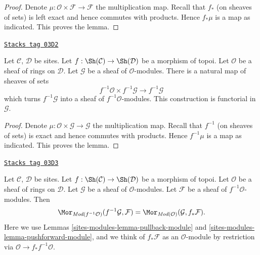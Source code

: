 \begin{proof}
Denote $\mu : \mathcal{O} \times \mathcal{F} \to \mathcal{F}$ the
multiplication map. Recall that $f_*$ (on sheaves of sets) is left exact
and hence commutes with products. Hence $f_*\mu$ is a map as
indicated. This proves the lemma.
\end{proof}

\begin{lemma}
\label{sites-modules-lemma-pullback-module}
\href{https://stacks.math.columbia.edu/tag/03D2}{\texttt{Stacks tag 03D2}}

Let $\mathcal{C}$, $\mathcal{D}$ be sites.
Let $f : \Sh(\mathcal{C}) \to \Sh(\mathcal{D})$
be a morphism of topoi.
Let $\mathcal{O}$ be a sheaf of rings on $\mathcal{D}$.
Let $\mathcal{G}$ be a sheaf of $\mathcal{O}$-modules.
There is a natural map of sheaves of sets
$$
f^{-1}\mathcal{O} \times f^{-1}\mathcal{G}
\longrightarrow
f^{-1}\mathcal{G}
$$
which turns $f^{-1}\mathcal{G}$ into a sheaf of $f^{-1}\mathcal{O}$-modules.
This construction is functorial in $\mathcal{G}$.
\end{lemma}

\begin{proof}
Denote $\mu : \mathcal{O} \times \mathcal{G} \to \mathcal{G}$ the
multiplication map. Recall that $f^{-1}$ (on sheaves of sets) is exact
and hence commutes with products. Hence $f^{-1}\mu$ is a map as
indicated. This proves the lemma.
\end{proof}

\begin{lemma}
\label{sites-modules-lemma-adjoint-push-pull-modules}
\href{https://stacks.math.columbia.edu/tag/03D3}{\texttt{Stacks tag 03D3}}

Let $\mathcal{C}$, $\mathcal{D}$ be sites.
Let $f : \Sh(\mathcal{C}) \to \Sh(\mathcal{D})$
be a morphism of topoi.
Let $\mathcal{O}$ be a sheaf of rings on $\mathcal{D}$.
Let $\mathcal{G}$ be a sheaf of $\mathcal{O}$-modules.
Let $\mathcal{F}$ be a sheaf of $f^{-1}\mathcal{O}$-modules.
Then
$$
\Mor_{\textit{Mod}(f^{-1}\mathcal{O})}(f^{-1}\mathcal{G}, \mathcal{F})
=
\Mor_{\textit{Mod}(\mathcal{O})}(\mathcal{G}, f_*\mathcal{F}).
$$
Here we use
Lemmas \ref{sites-modules-lemma-pullback-module}
and \ref{sites-modules-lemma-pushforward-module}, and we think of
$f_*\mathcal{F}$ as an $\mathcal{O}$-module by restriction via
$\mathcal{O} \to f_*f^{-1}\mathcal{O}$.
\end{lemma}


